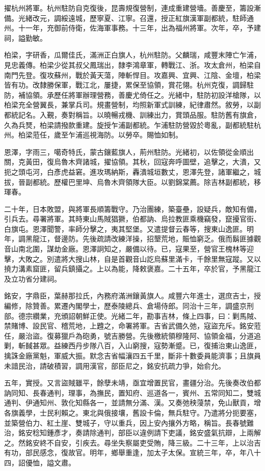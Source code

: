 \begin{pinyinscope}
擢杭州將軍。杭州駐防自克復後，昆壽規復營制，連成重建營墻。善慶至，籌設漸備。光緒改元，調綏遠城，歷寧夏、江寧。召還，授正紅旗漢軍副都統，駐師通州。十一年，充御前侍衛，佐海軍事務。十三年，出為福州將軍。次年，卒，予建祠，謚勤敏。

柏梁，字研香，瓜爾佳氏，滿洲正白旗人，杭州駐防。父麟瑞，咸豐末陣亡乍浦，見忠義傳。柏梁少從其叔父鳳瑞出，隸李鴻章軍，轉戰江、浙。攻太倉州，柏梁自南門先登。復攻蘇州，戰於黃天蕩，陣斬悍目。攻嘉興、宜興、江陰、金壇，柏梁皆有功。改隸勝保軍，戰江北，屢捷，累保至協領，賞花翎。杭州克復，調歸駐防，補協領。承歷任將軍辦理營務，善慶尤倚任之。光緒中，駐防初設洋槍隊，以柏梁充全營翼長，兼掌兵司。規畫營制，均照新軍式訓練，紀律肅然。敘勞，以副都統記名。入覲，奏對稱旨。以曉暢戎機、訓練出力，賞頭品服。駐防舊有旗倉，久為兵燹，柏梁請撥款重建。旋授乍浦副都統。乍浦駐防營毀於粵亂，副都統駐杭州。柏梁蒞任，歲至乍浦巡視海防。以勞卒。賜恤如制。

恩澤，字雨三，噶奇特氏，蒙古鑲藍旗人，荊州駐防。光緒初，以佐領從金順出關，克黃田，復烏魯木齊諸城，擢協領。其秋，回寇奔呼圖壁，追擊之，大潰，又扼之頭屯河，白彥虎益窘。進攻瑪納斯，轟潰城垣數丈，恩澤先登，諸軍繼之，城拔，晉副都統。歷權巴里坤、烏魯木齊領隊大臣。以劉錦棠薦。除吉林副都統，移琿春。

二十年，日本敗盟，與將軍長順籌戰守。乃治團練，築臺壘，設疑兵，敵知有備，引兵去。尋署將軍。其時東山馬賊猖獗，伯都訥、烏拉教匪乘機竊發，竄擾官街、白旗屯。恩澤聞警，率師分擊之，夷其堅堡。又遣提督云春等，搜東山逸匪。明年，調黑龍江，督邊防。先後疏請改練洋操，招墾荒地，賑恤窮乏。俄而鬍匪據觀音山南北圍，謀劫金廠。恩澤詗知之，嚴備以待。已，寇果至，營官王槐林等迎擊，大敗之。別遣將大搜山林，自是首觀音山訖烏蘇里滿卡，千餘里無寇蹤。又以撓力溝素窟匪，留兵鎮攝之。上以為能，降敕褒嘉。二十五年，卒於官，予黑龍江及立功省分建祠。

銘安，字鼎臣，葉赫那拉氏，內務府滿洲鑲黃旗人。咸豐六年進士，選庶吉士，授編修，除贊善。累遷內閣學士，歷泰陵總兵、倉場侍郎。同治十三年，調盛京刑部。德宗纘業，充頒詔朝鮮正使。光緒二年，勘事吉林，條上四事，曰：剿馬賊、禁賭博、設民官、稽荒地，上韙之，命署將軍。吉省武備久弛，寇盜充斥。銘安蒞任，嚴治盜。復募獵戶為砲勇，號吉勝營。先後檄統領穆隆阿、協領金福，分道追剿，斬馘甚眾。益練西丹步隊八百，入山窮搜，寇勢漸蹙。已，復捕治東山逸匪，擒誅金廠黨魁，軍威大振。默念吉省幅瀼四五千里，斷非十數委員能濟事；且旗員未諳民治，請破積習，調用漢官，部臣尼之，銘安抗疏力爭，始俞允。

五年，實授。又言盜賊雖平，餘孽未靖，亟宜增置民官，畫疆分治。先後奏改伯都訥同知、長春通判，理事，為撫民，置知府、巡道各一，賓州、五常同知二，雙城通判、伊通知州、敦化知縣各一，並請無分滿、漢。又奏弛秧蓡禁，免山獸貢，增各旗義學，士民利賴之。東北與俄接壤，舊設卡倫，無兵駐守。乃遣將分扼要塞，並築營伯力、紅土崖、雙城子，守以重兵，因上安內攘外方略，稱旨。長春號難治，銘安稔知鍾彥才，奏請除通判，部臣以違例請下吏議，銘安盛氣抗辯，上兩解之。然銘安終不自安，引疾去。尋坐失察屬吏受賄，降三級。二十三年，上以治吉有功，部民感念，復故官。明年，鄉舉重逢，加太子太保。宣統三年，卒，年八十四，詔優恤，謚文肅。


\end{pinyinscope}
